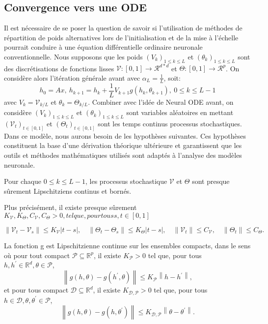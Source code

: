  \subsection{Convergence vers une ODE}
 Il est nécessaire de se poser la question de savoir si l'utilisation de méthodes de répartition de poids alternatives lors de l'initialisation et de la mise à l'échelle pourrait conduire à une équation différentielle ordinaire neuronale conventionnelle. Nous supposons que les poids $(V_k)_{1\leqslant k \leqslant L }$ et $(\theta_k)_{1\leqslant k \leqslant L }$ sont des discrétisations de fonctions lisses $\mathcal{V}:[0,1] \to \mathcal{R}^{d*d}$ et $\Theta:[0,1] \to \mathcal{R}^{p}$. On considère alors l’itération générale avant avec $\alpha_L = \frac{1}{L}$, soit:
 \begin{equation}
     h_0 = Ax,\ h_{k+1} = h_k + \frac{1}{L}V_{k+1}g(h_k,\theta_{k+1}),\ 0 \leqslant k \leqslant L-1
 \end{equation}
avec $V_k = \mathcal{V}_{k/L}$ et $\theta_k = \Theta_{k/L}$.
Combiner avec l'idée de Neural ODE avant, on considère $(V_k)_{1\leqslant k \leqslant L }$ et $(\theta_k)_{1\leqslant k \leqslant L }$ sont variables aléatoires en mettant $(\mathcal{V}_t)_{t \in [0,1]}$ et $(\Theta_t)_{t \in [0,1]}$ sont les temps continus
processus stochastiques. Dans ce modèle, nous aurons besoin de les hypothèses suivantes. Ces hypothèses constituent la base d'une dérivation théorique ultérieure et garantissent que les outils et méthodes mathématiques utilisés sont adaptés à l'analyse des modèles neuronale. 

\begin{assumption}\label{H5}
Pour chaque $0 \leqslant k \leqslant L-1$, les processus stochastique $\mathcal{V}$ et $\Theta$ sont presque sûrement Lipschitziens continus et bornés.
\end{assumption}

Plus précisément, il existe presque sûrement $K_{\mathscr{V}}, K_{\Theta}, C_{\mathscr{V}}, C_{\Theta}>0,tel que, pour tous s, t \in[0,1]$

$$
\left\|\mathscr{V}_t-\mathscr{V}_s\right\| \leqslant K_{\mathscr{V}}|t-s|, \quad\left\|\Theta_t-\Theta_s\right\| \leqslant K_{\Theta}|t-s|, \quad\left\|\mathscr{V}_t\right\| \leqslant C_{\mathscr{V}}, \quad\left\|\Theta_t\right\| \leqslant C_{\Theta} .
$$

\begin{assumption}\label{H6}
 La fonction g est Lipschitzienne continue sur les ensembles compacts, dans le sens où pour tout compact $\mathscr{P} \subseteq \mathbb{R}^p$, il existe $K_{\mathscr{P}} > 0$  tel que, pour tous $h, h^{\prime} \in \mathbb{R}^d, \theta \in \mathscr{P}$,
$$
\left\|g(h, \theta)-g\left(h^{\prime}, \theta\right)\right\| \leqslant K_{\mathscr{P}}\left\|h-h^{\prime}\right\|,
$$
et pour tous compact $\mathscr{D} \subseteq \mathbb{R}^d$, il existe $K_{\mathscr{D}, \mathscr{P}}>0$ tel que, pour tous $h \in \mathscr{D}, \theta, \theta^{\prime} \in \mathscr{P}$,
$$
\left\|g(h, \theta)-g\left(h, \theta^{\prime}\right)\right\| \leqslant K_{\mathscr{D}, \mathscr{P}}\left\|\theta-\theta^{\prime}\right\| .
$$
\end{assumption}


